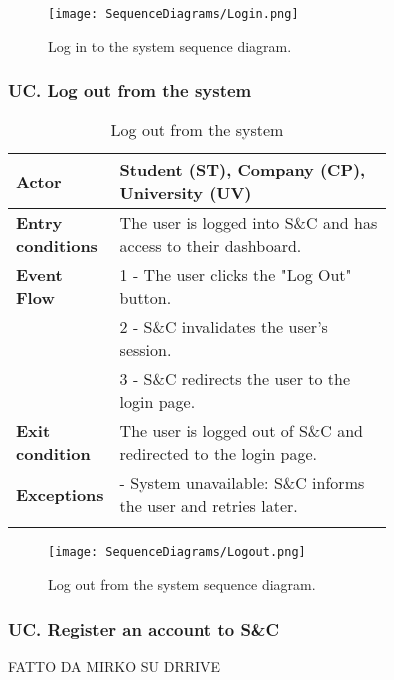 \begin{figure}[H]
    \begin{center}
        \texttt{[image: SequenceDiagrams/Login.png]}
        \caption{Log in to the system sequence diagram.}
        \label{fig:login_seqd}%
    \end{center}
\end{figure}

\subsubsection*{UC\cuc . Log out from the system}
\begin{center}
    \begin{longtable}{|l|p{0.75\linewidth}|}
        \hline
        \textbf{Actor}            & Student (ST), Company (CP), University (UV) \\
        \hline
        \textbf{Entry conditions} & The user is logged into S\&C and has access to their dashboard. \\
        \hline
        \textbf{Event Flow}       & 1 - The user clicks the "Log Out" button. \\
                                  & 2 - S\&C invalidates the user's session. \\
                                  & 3 - S\&C redirects the user to the login page. \\
        \hline
        \textbf{Exit condition}   & The user is logged out of S\&C and redirected to the login page. \\       
        \hline
        \textbf{Exceptions}       & - System unavailable: S\&C informs the user and retries later. \\
        \hline
        \caption{Log out from the system}
        \label{tab:logout_usecase}
    \end{longtable}
\end{center}

\begin{figure}[H]
    \begin{center}
        \texttt{[image: SequenceDiagrams/Logout.png]}
        \caption{Log out from the system sequence diagram.}
        \label{fig:logout_seqd}%
    \end{center}
\end{figure}

\subsubsection*{UC\cuc . Register an account to S\&C}
FATTO DA MIRKO SU DRRIVE

